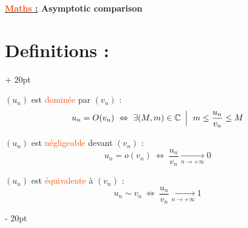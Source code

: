 \documentclass[a4paper, 12pt, twoside]{article}
\renewcommand{\emph}{\textcolor{ff4500}}
\newcommand{\C}{\mathbb{C}} %
\newcommand{\tendsto}[1]{\xrightarrow[#1]{}}
\newcommand{\ssi}{\ \Leftrightarrow \ }
\newcommand{\ind}[1][20pt]{\advance\leftskip + #1}
\newcommand{\deind}[1][20pt]{\advance\leftskip - #1}
\newenvironment{indentedenv}[1][20pt]{\par \ind[#1]}{\par \deind}
\newenvironment{indt}[2][20pt]{#2 \begin{indentedenv}[#1]}{\end{indentedenv}} %
\newcommand{\thetitle}[2]{\begin{center}\textbf{{\LARGE \underline{\emph{#1} :}} {\Large #2}}\end{center}}
\begin{document}
    \thetitle{Maths}{Asymptotic comparison}    
    
    
    \begin{indt}{\section{Definitions :}}
        
        $(u_n)$ est \emph{dominée} par $(v_n)$ :
        \vspace{-12pt}
        \[u_n = O(v_n) \ssi \exists (M, m) \in \C\ \left|\vphantom{\dfrac a b}\right.\ m \le \dfrac{u_n}{v_n} \le M \]
        
        \vspace{6pt}
        
        $(u_n)$ est \emph{négligeable} devant $(v_n)$ :
        \vspace{-12pt}
        \[u_n = o(v_n) \ssi \dfrac{u_n}{v_n} \tendsto{n \to +\infty} 0\]
        
        \vspace{6pt}
        
        $(u_n)$ est \emph{équivalente} à $(v_n)$ :
        \vspace{-12pt}
        \[ u_n \sim v_n \ssi \dfrac{u_n}{v_n} \tendsto{n \to +\infty} 1 \]
    
    \end{indt}
    
\end{document}
